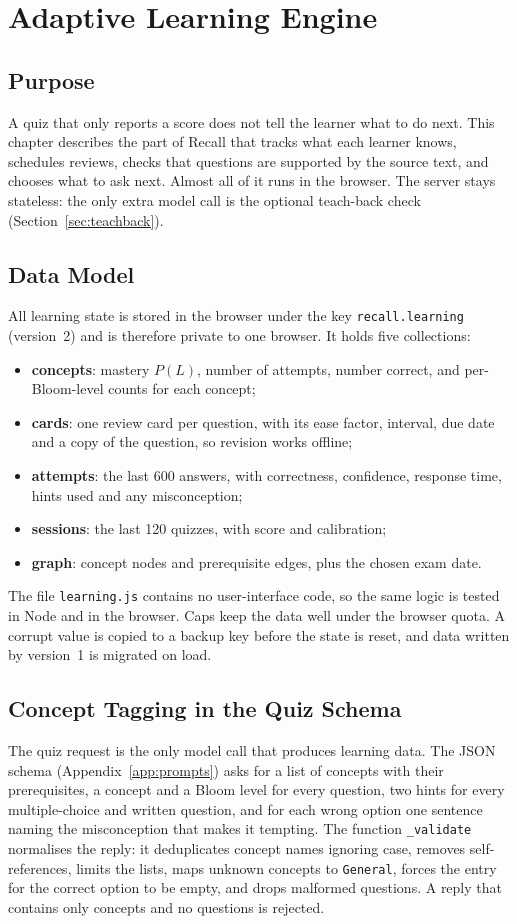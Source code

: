 \chapter{Adaptive Learning Engine}
\label{chap:adaptive}

\section{Purpose}
A quiz that only reports a score does not tell the learner what to do next. This chapter describes the part of Recall that tracks what each learner knows, schedules reviews, checks that questions are supported by the source text, and chooses what to ask next. Almost all of it runs in the browser. The server stays stateless: the only extra model call is the optional teach-back check (Section~\ref{sec:teachback}).

\section{Data Model}
All learning state is stored in the browser under the key \texttt{recall.learning} (version~2) and is therefore private to one browser. It holds five collections:
\begin{itemize}
\item \textbf{concepts}: mastery $P(L)$, number of attempts, number correct, and per-Bloom-level counts for each concept;
\item \textbf{cards}: one review card per question, with its ease factor, interval, due date and a copy of the question, so revision works offline;
\item \textbf{attempts}: the last 600 answers, with correctness, confidence, response time, hints used and any misconception;
\item \textbf{sessions}: the last 120 quizzes, with score and calibration;
\item \textbf{graph}: concept nodes and prerequisite edges, plus the chosen exam date.
\end{itemize}
The file \texttt{learning.js} contains no user-interface code, so the same logic is tested in Node and in the browser. Caps keep the data well under the browser quota. A corrupt value is copied to a backup key before the state is reset, and data written by version~1 is migrated on load.

\section{Concept Tagging in the Quiz Schema}
The quiz request is the only model call that produces learning data. The JSON schema (Appendix~\ref{app:prompts}) asks for a list of concepts with their prerequisites, a concept and a Bloom level for every question, two hints for every multiple-choice and written question, and for each wrong option one sentence naming the misconception that makes it tempting. The function \texttt{\_validate} normalises the reply: it deduplicates concept names ignoring case, removes self-references, limits the lists, maps unknown concepts to \texttt{General}, forces the entry for the correct option to be empty, and drops malformed questions. A reply that contains only concepts and no questions is rejected.

